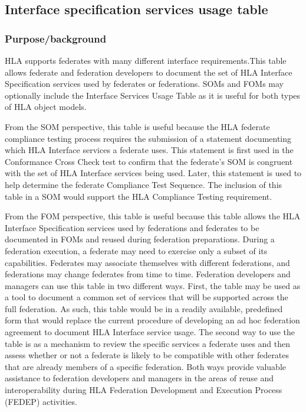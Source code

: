 \newpage

\subsection{Interface specification services usage table}

\subsubsection{Purpose/background}
HLA supports federates with many different interface requirements.This table allows federate and federation developers to document the set of HLA Interface Specification services used by federates or federations. SOMs and FOMs may optionally include the Interface Services Usage Table as it is useful for both types of HLA object models.

From the SOM perspective, this table is useful because the HLA federate compliance testing process requires the submission of a statement documenting which HLA Interface services a federate uses. This statement is first used in the Conformance Cross Check test to confirm that the federate's SOM is congruent with the set of HLA Interface services being used. Later, this statement is used to help determine the federate Compliance Test Sequence. The inclusion of this table in a SOM would support the HLA Compliance Testing requirement.

From the FOM perspective, this table is useful because this table allows the HLA Interface Specification services used by federations and federates to be documented in FOMs and reused during federation preparations. During a federation execution, a federate may need to exercise only a subset of its capabilities. Federates may associate themselves with different federations, and federations may change federates from time to time. Federation developers and managers can use this table in two different ways. First, the table may be used as a tool to document a common set of services that will be supported across the full federation. As such, this table would be in a readily available, predefined form that would replace the current procedure of developing an ad hoc federation agreement to document HLA Interface service usage. The second way to use the table is as a mechanism to review the specific services a federate uses and then assess whether or not a federate is likely to be compatible with other federates that are already members of a specific federation. Both ways provide valuable assistance to federation developers and managers in the areas of reuse and interoperability during HLA Federation Development and Execution Process (FEDEP) activities.

